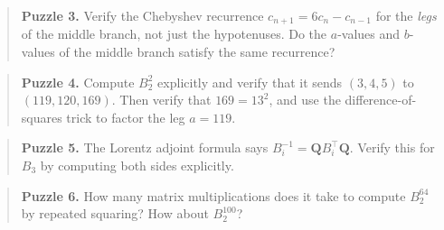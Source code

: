 \begin{quote}
\textbf{Puzzle 3.} Verify the Chebyshev recurrence \(c_{n+1} = 6c_n - c_{n-1}\) for the \emph{legs} of the middle branch, not just the hypotenuses. Do the \(a\)-values and \(b\)-values of the middle branch satisfy the same recurrence?
\end{quote}

\begin{quote}
\textbf{Puzzle 4.} Compute \(B_2^2\) explicitly and verify that it sends \((3, 4, 5)\) to \((119, 120, 169)\). Then verify that \(169 = 13^2\), and use the difference-of-squares trick to factor the leg \(a = 119\).
\end{quote}

\begin{quote}
\textbf{Puzzle 5.} The Lorentz adjoint formula says \(B_i^{-1} = \mathbf{Q} B_i^\top \mathbf{Q}\). Verify this for \(B_3\) by computing both sides explicitly.
\end{quote}

\begin{quote}
\textbf{Puzzle 6.} How many matrix multiplications does it take to compute \(B_2^{64}\) by repeated squaring? How about \(B_2^{100}\)?
\end{quote}
